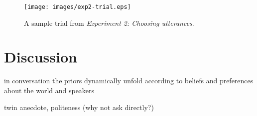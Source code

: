 \documentclass[10pt,a4paper]{article}
\begin{document}
\begin{figure}[ht]
	\centering
	\texttt{[image: images/exp2-trial.eps]}
	\caption{A sample trial from \emph{Experiment 2: Choosing utterances}.}\label{exp2-trial}
\end{figure}

\section{Discussion}

in conversation the priors dynamically unfold according to beliefs and preferences about the world and speakers

twin anecdote, politeness (why not ask directly?)


\setlength{\bibleftmargin}{.125in}
\setlength{\bibindent}{-\bibleftmargin}


\end{document}
